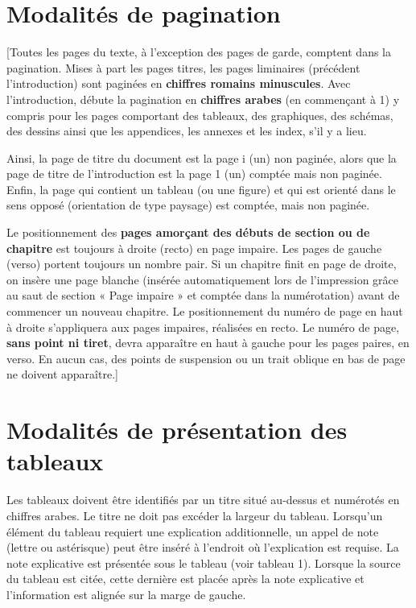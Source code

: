 \section*{Modalités de pagination} %

[Toutes les pages du texte, à l’exception des pages de garde, comptent dans la pagination. Mises à part les pages titres, les pages liminaires (précédent l’introduction) sont paginées en \textbf{chiffres romains minuscules}. Avec l’introduction, débute la pagination en \textbf{chiffres arabes} (en commençant à 1) y compris pour les pages comportant des tableaux, des graphiques, des schémas, des dessins ainsi que les appendices, les annexes et les index, s'il y a lieu.

Ainsi, la page de titre du document est la page i (un) non paginée, alors que la page de titre de l’introduction est la page 1 (un) comptée mais non paginée. Enfin, la page qui contient un tableau (ou une figure) et qui est orienté dans le sens opposé (orientation de type paysage) est comptée, mais non paginée.

Le positionnement des \textbf{pages amorçant des débuts de section ou de chapitre} est toujours à droite (recto) en page impaire. Les pages de gauche (verso) portent toujours un nombre pair. Si un chapitre finit en page de droite, on insère une page blanche (insérée automatiquement lors de l’impression grâce au saut de section « Page impaire » et comptée dans la numérotation) avant de commencer un nouveau chapitre. Le positionnement du numéro de page en haut à droite s’appliquera aux pages impaires, réalisées en recto. Le numéro de page, \textbf{sans point ni tiret}, devra apparaître en haut à gauche pour les pages paires, en verso. En aucun cas, des points de suspension ou un trait oblique en bas de page ne doivent apparaître.]

\section*{Modalités de présentation des tableaux}

Les tableaux doivent être identifiés par un titre situé au-dessus et numérotés en chiffres arabes. Le titre ne doit pas excéder la largeur du tableau. Lorsqu’un élément du tableau requiert une explication additionnelle, un appel de note (lettre ou astérisque) peut être inséré à l’endroit où l’explication est requise. La note explicative est présentée sous le tableau (voir tableau 1). Lorsque la source du tableau est citée, cette dernière est placée après la note explicative et l’information est alignée sur la marge de gauche.

